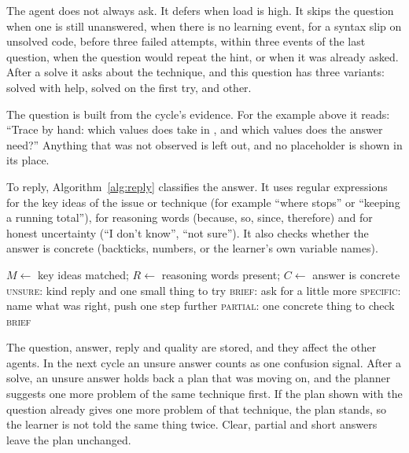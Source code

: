 The agent does not always ask. It defers when load is high. It skips the question when one is still unanswered, when there is no learning event, for a syntax slip on unsolved code, before three failed attempts, within three events of the last question, when the question would repeat the hint, or when it was already asked. After a solve it asks about the technique, and this question has three variants: solved with help, solved on the first try, and other.

The question is built from the cycle's evidence. For the example above it reads: ``Trace  by hand: which values does  take in , and which values does the answer need?'' Anything that was not observed is left out, and no placeholder is shown in its place.

To reply, Algorithm~\ref{alg:reply} classifies the answer. It uses regular expressions for the key ideas of the issue or technique (for example ``where  stops'' or ``keeping a running total''), for reasoning words (because, so, since, therefore) and for honest uncertainty (``I don't know'', ``not sure''). It also checks whether the answer is concrete (backticks, numbers, or the learner's own variable names).

\begin{algorithm}[htbp]
\caption{Reflection reply classification}\label{alg:reply}
\small
\begin{algorithmic}[1]
\State $M \gets$ key ideas matched; $R \gets$ reasoning words present; $C \gets$ answer is concrete
 \Return \textsc{unsure}: kind reply and one small thing to try
\EndIf
{} \Return \textsc{brief}: ask for a little more
\EndIf
{} \Return \textsc{specific}: name what was right, push one step further
\EndIf
{} \Return \textsc{partial}: one concrete thing to check
\EndIf
\State \Return \textsc{brief}
\end{algorithmic}
\end{algorithm}

The question, answer, reply and quality are stored, and they affect the other agents. In the next cycle an unsure answer counts as one confusion signal. After a solve, an unsure answer holds back a plan that was moving on, and the planner suggests one more problem of the same technique first. If the plan shown with the question already gives one more problem of that technique, the plan stands, so the learner is not told the same thing twice. Clear, partial and short answers leave the plan unchanged.

